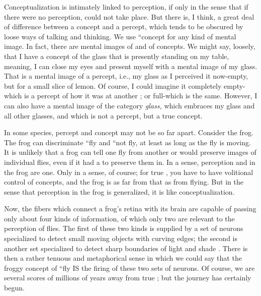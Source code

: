Conceptualization is intimately linked to perception, if only in the sense that if there were no perception,  could not take place. But there is, I think, a great deal of difference between a concept and a percept, which tends to be obscured by loose ways of talking and thinking. We use ``concept for any kind of mental image. In fact, there are mental images of  and of concepts. We might say, loosely, that I have a concept of the glass that is presently standing on my table, meaning, I can close my eyes and present myself with a mental image of my glass. That is a mental image of a percept, i.e., my glass as I perceived it now-empty, but for a small slice of lemon. Of course, I could imagine it completely empty-which is a percept of how it was at another ; or full-which is the same. However, I can also have a mental image of the category \textit{glass,} which embraces
my glass and all other glasses, and which is not a percept, but a true concept.

In some species, percept and concept may not be so far apart.
Consider the frog. The frog can discriminate ``fly and ``not fly, at least as long as the fly is moving. It is unlikely that a frog can tell one fly from another or would preserve  images of individual flies, even if it had a  to preserve them in. In a sense, percep\-tion and  in the frog are one. Only in a sense, of course; for true , you have to have volitional con\-trol of concepts, and the frog is as far from that as from flying. But in the sense that perception in the frog is generalized, it is like con\-ceptualization.

Now, the fibers which connect a frog's retina with its brain are capable of passing only about four kinds of information, of which only two are relevant to the perception of flies. The first of these two kinds is supplied by a set of neurons specialized to detect small moving objects with curving edges; the second is another set specialized to detect sharp boundaries of light and shade \citep{Burton1970}. There is then a rather tenuous and metaphorical sense in which we could say that the froggy concept of ``fly IS the firing of these two sets of neurons. Of course, we are several scores of millions of years away from true ; but the journey has certainly begun.

